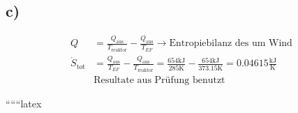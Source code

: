 

\subsection*{c)}
\begin{align*}
Q &= \frac{Q_{\text{aus}}}{T_{\text{reaktor}}} - \frac{Q_{\text{aus}}}{T_{EF}} \rightarrow \text{Entropiebilanz} \text{ des um Wind} \\
\dot{S}_{\text{tot}} &= \frac{Q_{\text{aus}}}{T_{EF}} - \frac{Q_{\text{aus}}}{T_{\text{reaktor}}} = \frac{654 \text{kJ}}{285 \text{K}} - \frac{654 \text{kJ}}{373.15 \text{K}} = 0.04615 \frac{\text{kJ}}{\text{K}} \\
&\text{Resultate aus Prüfung benutzt}
\end{align*}

``````latex